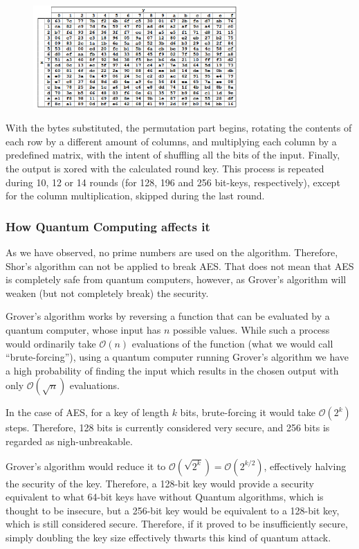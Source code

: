 \begin{figure}[H]
    \centering
    \includegraphics[width=0.7\textwidth]{images/aes-table}
\end{figure}

With the bytes substituted, the permutation part begins, rotating the contents
of each row by a different amount of columns, and multiplying each column by a
predefined matrix, with the intent of shuffling all the bits of the input.
Finally, the output is xored with the calculated round key. This process is
repeated during 10, 12 or 14 rounds (for 128, 196 and 256 bit-keys,
respectively), except for the column multiplication, skipped during the last
round.

\subsubsection{How Quantum Computing affects it}

As we have observed, no prime numbers are used on the algorithm. Therefore,
Shor's algorithm can not be applied to break AES. That does not mean that AES is
completely safe from quantum computers, however, as Grover's algorithm will
weaken (but not completely break) the security.

Grover's algorithm works by reversing a function that can be evaluated by a
quantum computer, whose input has $n$ possible values. While such a process would
ordinarily take $\mathcal{O}(n)$ evaluations of the function (what we would call
“brute-forcing”), using a quantum computer running Grover's algorithm we have a
high probability of finding the input which results in the chosen output with
only $\mathcal{O}(\sqrt{n})$ evaluations.

In the case of AES, for a key of length $k$ bits, brute-forcing it would take
$\mathcal{O}(2^k)$ steps. Therefore, 128 bits is currently considered very
secure, and 256 bits is regarded as nigh-unbreakable.

Grover's algorithm would reduce it to $\mathcal{O}\left(\sqrt{2^k}\right) =
\mathcal{O}\left({2^{k/2}}\right) $, effectively halving the security of the
key. Therefore, a 128-bit key would provide a security equivalent to what 64-bit
keys have without Quantum algorithms, which is thought to be insecure, but a
256-bit key would be equivalent to a 128-bit key, which is still considered
secure. Therefore, if it proved to be insufficiently secure, simply doubling the
key size effectively thwarts this kind of quantum attack.


